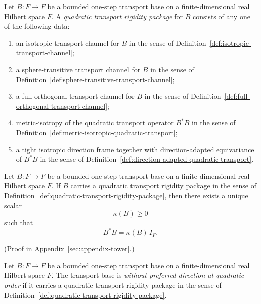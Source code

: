 \begin{definition}
\label{def:quadratic-transport-rigidity-package}
Let $B:F\to F$ be a bounded one-step transport base on a finite-dimensional
real Hilbert space $F$. A \emph{quadratic transport rigidity package} for $B$
consists of any one of the following data:
\begin{enumerate}[label=(\roman*), leftmargin=2em, itemsep=0.2em]
\item an isotropic transport channel for $B$ in the sense of
      Definition~\ref{def:isotropic-transport-channel};
\item a sphere-transitive transport channel for $B$ in the sense of
      Definition~\ref{def:sphere-transitive-transport-channel};
\item a full orthogonal transport channel for $B$ in the sense of
      Definition~\ref{def:full-orthogonal-transport-channel};
\item metric-isotropy of the quadratic transport operator $B^*B$ in the sense
      of Definition~\ref{def:metric-isotropic-quadratic-transport};
\item a tight isotropic direction frame together with direction-adapted
      equivariance of $B^*B$ in the sense of
      Definition~\ref{def:direction-adapted-quadratic-transport}.
\end{enumerate}
\end{definition}

\begin{theorem}
\label{thm:quadratic-transport-rigidity}
Let $B:F\to F$ be a bounded one-step transport base on a finite-dimensional
real Hilbert space $F$. If $B$ carries a quadratic transport rigidity package
in the sense of Definition~\ref{def:quadratic-transport-rigidity-package},
then there exists a unique scalar
\[
\kappa(B)\ge 0
\]
such that
\[
B^*B=\kappa(B)\,I_F.
\]
\end{theorem}

(Proof in Appendix~\ref{sec:appendix-tower}.)

\begin{definition}
\label{def:no-preferred-direction-quadratic-transport}
Let $B:F\to F$ be a bounded one-step transport base on a finite-dimensional
real Hilbert space $F$. The transport base is \emph{without preferred
direction at quadratic order} if it carries a quadratic transport rigidity
package in the sense of
Definition~\ref{def:quadratic-transport-rigidity-package}.
\end{definition}

